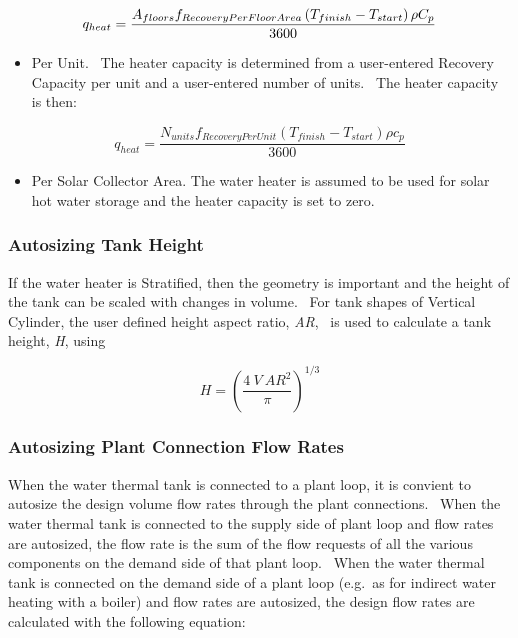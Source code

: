 \begin{equation}
  q_{heat} = \frac{A_{floors}f_{RecoveryPerFloorArea}\left(T_{finish} - T_{start}\right)\rho C_p}{3600}
\end{equation}

\begin{itemize}
\item Per Unit.~ The heater capacity is determined from a user-entered Recovery Capacity per unit and a user-entered number of units.~ The heater capacity is then:
\end{itemize}

\begin{equation}
{q_{heat}} = \frac{{{N_{units}}{f_{RecoveryPerUnit}}({T_{finish}} - {T_{start}})\rho {c_p}}}{{3600}}
\end{equation}

\begin{itemize}
\item Per Solar Collector Area. The water heater is assumed to be used for solar hot water storage and the heater capacity is set to zero.
\end{itemize}

\subsubsection{Autosizing Tank Height}\label{autosizing-tank-height}

If the water heater is Stratified, then the geometry is important and the height of the tank can be scaled with changes in volume.~ For tank shapes of Vertical Cylinder, the user defined height aspect ratio, \emph{AR},~ is used to calculate a tank height, \emph{H}, using

\begin{equation}
H = {\left( {\frac{{4~V~A{R^2}}}{\pi }} \right)^{1/3}}
\end{equation}

\subsubsection{Autosizing Plant Connection Flow Rates}\label{autosizing-plant-connection-flow-rates}

When the water thermal tank is connected to a plant loop, it is convient to autosize the design volume flow rates through the plant connections.~ When the water thermal tank is connected to the supply side of plant loop and flow rates are autosized, the flow rate is the sum of the flow requests of all the various components on the demand side of that plant loop.~ When the water thermal tank is connected on the demand side of a plant loop (e.g.~as for indirect water heating with a boiler) and flow rates are autosized, the design flow rates are calculated with the following equation:

